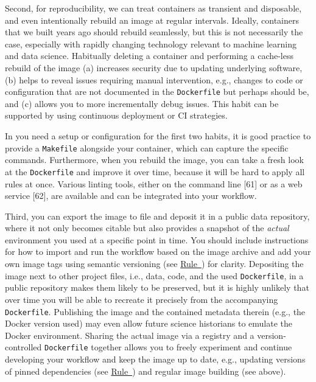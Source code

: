 \documentclass[10pt,letterpaper]{article}
\begin{document}
Second, for reproducibility, we can treat containers as transient and
disposable, and even intentionally rebuild an image at regular
intervals. Ideally, containers that we built years ago should rebuild
seamlessly, but this is not necessarily the case, especially with
rapidly changing technology relevant to machine learning and data
science. Habitually deleting a container and performing a cache-less
rebuild of the image (a) increases security due to updating underlying
software, (b) helps to reveal issues requiring manual intervention,
e.g., changes to code or configuration that are not documented in the
\texttt{Dockerfile} but perhaps should be, and (c) allows you to more
incrementally debug issues. This habit can be supported by using
continuous deployment or CI strategies.

In you need a setup or configuration for the first two habits, it is
good practice to provide a \texttt{Makefile} alongside your container,
which can capture the specific commands. Furthermore, when you rebuild
the image, you can take a fresh look at the \texttt{Dockerfile} and
improve it over time, because it will be hard to apply all rules at
once. Various linting tools, either on the command line {[}61{]} or as a
web service {[}62{]}, are available and can be integrated into your
workflow.

Third, you can export the image to file and deposit it in a public data
repository, where it not only becomes citable but also provides a
snapshot of the \emph{actual} environment you used at a specific point
in time. You should include instructions for how to import and run the
workflow based on the image archive and add your own image tags using
semantic versioning (see
\hyperref[{rule:base}]{Rule~}) for clarity.
Depositing the image next to other project files, i.e., data, code, and
the used \texttt{Dockerfile}, in a public repository makes them likely
to be preserved, but it is highly unlikely that over time you will be
able to recreate it precisely from the accompanying \texttt{Dockerfile}.
Publishing the image and the contained metadata therein (e.g., the
Docker version used) may even allow future science historians to emulate
the Docker environment. Sharing the actual image via a registry and a
version-controlled \texttt{Dockerfile} together allows you to freely
experiment and continue developing your workflow and keep the image up
to date, e.g., updating versions of pinned dependencies (see
\hyperref[{rule:pinning}]{Rule~}) and regular
image building (see above).
\end{document}
